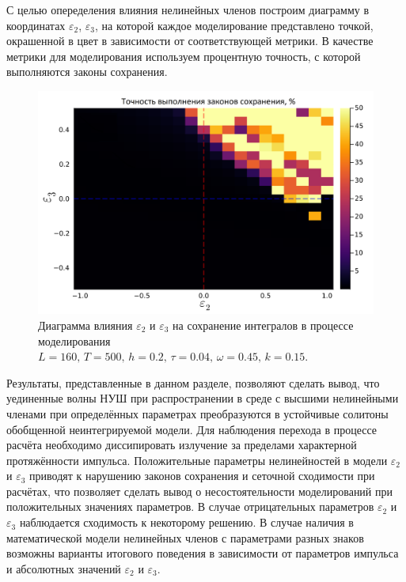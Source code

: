 \documentclass[14pt,a4paper]{extreport}
\begin{document}
			С целью опеределения влияния нелинейных членов построим диаграмму в координатах \(\varepsilon_{2}\), \(\varepsilon_{3}\), на которой каждое моделирование представлено точкой, окрашенной в цвет в зависимости от соответствующей метрики. В качестве метрики для моделирования используем процентную точность, с которой выполняются законы сохранения. %

			\begin{figure}[H]
				\begin{center}
					\includegraphics[width=0.7\linewidth]{fig85.png}
				\end{center}
				\caption{Диаграмма влияния \(\varepsilon_{2}\) и \(\varepsilon_{3}\) на сохранение интегралов в процессе моделирования
				\(L=160,\, T=500,\, h=0.2,\, \tau=0.04,\, \omega=0.45,\, k=0.15\).}
				\label{fig340-11}
			\end{figure}

			Результаты, представленные в данном разделе, позволяют сделать вывод, что уединенные волны НУШ при распространении в среде с высшими нелинейными членами при определённых параметрах преобразуются в устойчивые солитоны обобщенной неинтегрируемой модели. Для наблюдения перехода в процессе расчёта необходимо диссипировать излучение за пределами характерной протяжённости импульса. Положительные параметры нелинейностей в модели \(\varepsilon_{2}\) и \(\varepsilon_{3}\) приводят к нарушению законов сохранения и сеточной сходимости при расчётах, что позволяет сделать вывод о несостоятельности моделирований при положительных значениях параметров. В случае отрицательных параметров \(\varepsilon_{2}\) и \(\varepsilon_{3}\) наблюдается сходимость к некоторому решению. В случае наличия в математической модели нелинейных членов с параметрами разных знаков возможны варианты итогового поведения в зависимости от параметров импульса и абсолютных значений \(\varepsilon_{2}\) и \(\varepsilon_{3}\). 
\end{document}
